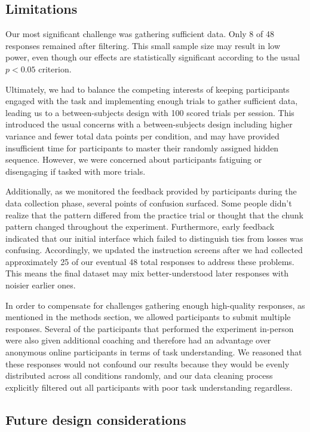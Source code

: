 \documentclass[11pt]{article}
\begin{document}
\subsection{Limitations}

Our most significant challenge was gathering sufficient data. Only 8 of 48 responses remained after filtering. This small sample size may result in low power, even though our effects are statistically significant according to the usual $p<0.05$ criterion.

Ultimately, we had to balance the competing interests of keeping participants engaged with the task and implementing enough trials to gather sufficient data, leading us to a between-subjects design with 100 scored trials per session. This introduced the usual concerns with a between-subjects design including higher variance and fewer total data points per condition, and may have provided insufficient time for participants to master their randomly assigned hidden sequence. However, we were concerned about participants fatiguing or disengaging if tasked with more trials.

Additionally, as we monitored the feedback provided by participants during the data collection phase, several points of confusion surfaced. Some people didn't realize that the pattern differed from the practice trial or thought that the chunk pattern changed throughout the experiment. Furthermore, early feedback indicated that our initial interface which failed to distinguish ties from losses was confusing. Accordingly, we updated the instruction screens after we had collected approximately 25 of our eventual 48 total responses to address these problems. This means the final dataset may mix better-understood later responses with noisier earlier ones.

In order to compensate for challenges gathering enough high-quality responses, as mentioned in the methods section, we allowed participants to submit multiple responses. Several of the participants that performed the experiment in-person were also given additional coaching and therefore had an advantage over anonymous online participants in terms of task understanding. We reasoned that these responses would not confound our results because they would be evenly distributed across all conditions randomly, and our data cleaning process explicitly filtered out all participants with poor task understanding regardless.

\subsection{Future design considerations}
\end{document}
